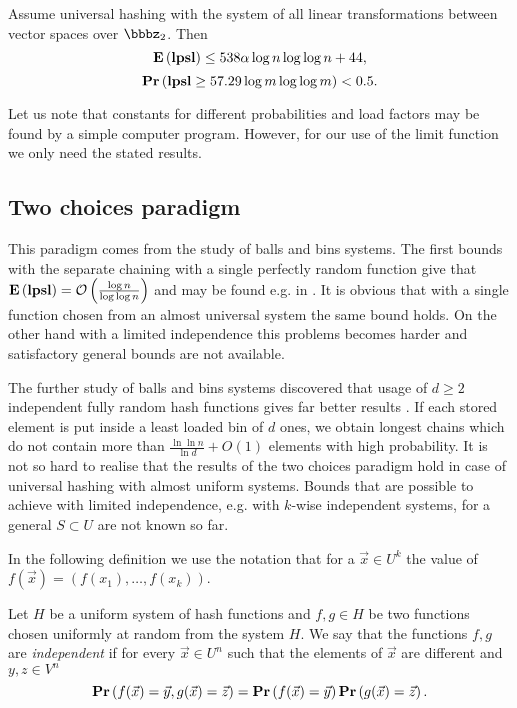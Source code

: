 \documentclass[runningheads,a4paper]{llncs}
\begin{document}
\begin{theorem}
Assume universal hashing with the system of all linear transformations between vector spaces over $\bbbz_2$. Then $$\mathbf{E}\left(\mathbf{lpsl}\right) \leq 538 \alpha \log n \log \log n + 44,$$ $$\mathbf{Pr}\left(\mathbf{lpsl} \geq 57.29 \log m \log \log m\right) < 0.5.$$
\end{theorem}

Let us note that constants for different probabilities and load factors may be found by a simple computer program. However, for our use of the limit function we only need the stated results.

\subsection{Two choices paradigm}
This paradigm comes from the study of balls and bins systems. The first bounds with the separate chaining with a single perfectly random function give that $\mathbf{E}\left(\mathbf{lpsl}\right) = \mathcal{O}\left(\frac{\log n}{\log \log n}\right)$ and may be found e.g. in \cite{DBLP:books/sp/Mehlhorn84}. It is obvious that with a single function chosen from an almost universal system the same bound holds. On the other hand with a limited independence this problems becomes harder and satisfactory general bounds are not available.

The further study of balls and bins systems discovered that usage of $d \geq 2$ independent fully random hash functions gives far better results \cite{DBLP:conf/stoc/AzarBKU94}. If each stored element is put inside a least loaded bin of $d$ ones, we obtain longest chains which do not contain more than $\frac{\ln \ln n}{\ln d} + O(1)$ elements with high probability. It is not so hard to realise that the results of the two choices paradigm hold in case of universal hashing with almost uniform systems. Bounds that are possible to achieve with limited independence, e.g. with $k$-wise independent systems, for a general $S \subset U$ are not known so far.

In the following definition we use the notation that for a $\vec{x} \in U^k$ the value of $f(\vec{x}) = (f(x_1), \dots, f(x_k))$.
\begin{definition}
\label{definition-independent-hash-functions}
Let $H$ be a uniform system of hash functions and $f, g \in H$ be two functions chosen uniformly at random from the system $H$. We say that the functions $f, g$ are \emph{independent} if for every $\vec{x} \in U^n$ such that the elements of $\vec{x}$ are different and $y, z \in V^n$ $$\mathbf{Pr}\left(f(\vec{x}) = \vec{y}, g(\vec{x}) = \vec{z}\right) = \mathbf{Pr}\left(f(\vec{x}) = \vec{y}\right) \mathbf{Pr}\left(g(\vec{x}) = \vec{z}\right).$$
\end{definition}
\end{document}
